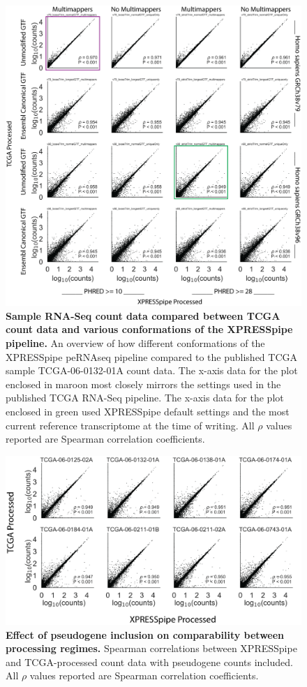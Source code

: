 \documentclass[10pt, oneside]{article}
\begin{document}
\begin{figure}
\centering
  \includegraphics[width=180mm]{figures/xpresspipe_supplement9.png}
  \caption{\textbf{Sample RNA-Seq count data compared between TCGA count data and various conformations of the XPRESSpipe pipeline.} An overview of how different conformations of the XPRESSpipe peRNAseq pipeline compared to the published TCGA sample TCGA-06-0132-01A count data. The x-axis data for the plot enclosed in maroon most closely mirrors the settings used in the published TCGA RNA-Seq pipeline. The x-axis data for the plot enclosed in green used XPRESSpipe default settings and the most current reference transcriptome at the time of writing. All $\rho$ values reported are Spearman correlation coefficients.}
  \label{fig:supplement5}
\end{figure}

\begin{figure}
\centering
  \includegraphics[width=180mm]{figures/xpresspipe_supplement10.png}
  \caption{\textbf{Effect of pseudogene inclusion on comparability between processing regimes.} Spearman correlations between XPRESSpipe and TCGA-processed count data with pseudogene counts included. All $\rho$ values reported are Spearman correlation coefficients.}
  \label{fig:supplement6}
\end{figure}
\end{document}
